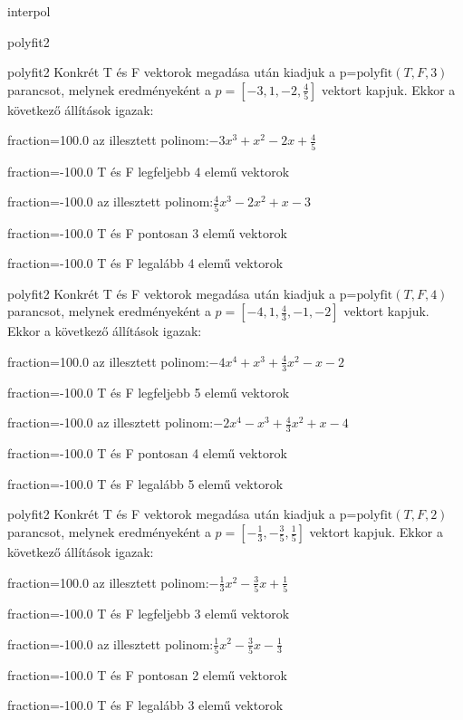 \documentclass[12pt]{article}
\begin{document}
\begin{quiz}{interpol}
\begin{multi}[multiple]{polyfit2}
\end{multi}
\begin{multi}[multiple]{polyfit2}
Konkrét T és F vektorok megadása után kiadjuk a p=$\mathrm{polyfit}(T,F,3)$
parancsot, melynek eredményeként a $p=\left[-3,1,-2,\frac{4}{5}\right]$ vektort kapjuk.
Ekkor a következő állítások igazak:
\item[fraction=100.0] az illesztett polinom:$-3x^3+x^2-2x+\frac{4}{5}$
\item[fraction=-100.0]  T és F legfeljebb 4 elemű vektorok
\item[fraction=-100.0]  az illesztett polinom:$\frac{4}{5}x^3-2x^2+x-3$
\item[fraction=-100.0]  T és F pontosan 3 elemű vektorok
\item[fraction=-100.0] T és F legalább 4 elemű vektorok
\end{multi}
\begin{multi}[multiple]{polyfit2}
Konkrét T és F vektorok megadása után kiadjuk a p=$\mathrm{polyfit}(T,F,4)$
parancsot, melynek eredményeként a $p=\left[-4,1,\frac{4}{3},-1,-2\right]$ vektort kapjuk.
Ekkor a következő állítások igazak:
\item[fraction=100.0] az illesztett polinom:$-4x^4+x^3+\frac{4}{3}x^2-x-2$
\item[fraction=-100.0]  T és F legfeljebb 5 elemű vektorok
\item[fraction=-100.0]  az illesztett polinom:$-2x^4-x^3+\frac{4}{3}x^2+x-4$
\item[fraction=-100.0]  T és F pontosan 4 elemű vektorok
\item[fraction=-100.0] T és F legalább 5 elemű vektorok
\end{multi}
\begin{multi}[multiple]{polyfit2}
Konkrét T és F vektorok megadása után kiadjuk a p=$\mathrm{polyfit}(T,F,2)$
parancsot, melynek eredményeként a $p=\left[-\frac{1}{3},-\frac{3}{5},\frac{1}{5}\right]$ vektort kapjuk.
Ekkor a következő állítások igazak:
\item[fraction=100.0] az illesztett polinom:$-\frac{1}{3}x^2-\frac{3}{5}x+\frac{1}{5}$
\item[fraction=-100.0]  T és F legfeljebb 3 elemű vektorok
\item[fraction=-100.0]  az illesztett polinom:$\frac{1}{5}x^2-\frac{3}{5}x-\frac{1}{3}$
\item[fraction=-100.0]  T és F pontosan 2 elemű vektorok
\item[fraction=-100.0] T és F legalább 3 elemű vektorok
\end{multi}

\end{quiz}
\end{document}
